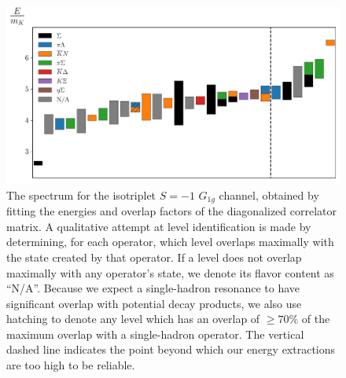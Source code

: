 \begin{figure}[H]
    \centering
    \hspace*{-0.5in}\includegraphics[width=\textwidth]{figures/sigmas/g1g/staircase_mk.pdf}
    \caption[The spectrum for the isotriplet $S=-1$ $G_{1g}$ channel, obtained by fitting the energies and overlap factors of the diagonalized correlator matrix.]{The spectrum for the isotriplet $S=-1$ $G_{1g}$ channel, obtained by fitting the energies and overlap factors of the diagonalized correlator matrix. A qualitative attempt at level identification is made by determining, for each operator, which level overlaps maximally with the state created by that operator. If a level does not overlap maximally with any operator's state, we denote its flavor content as ``N/A''. Because we expect a single-hadron resonance to have significant overlap with potential decay products, we also use hatching to denote any level which has an overlap of $\geq 70\%$ of the maximum overlap with a single-hadron operator. The vertical dashed line indicates the point beyond which our energy extractions are too high to be reliable.}\label{fig:g1g_spectrum}
\end{figure}

